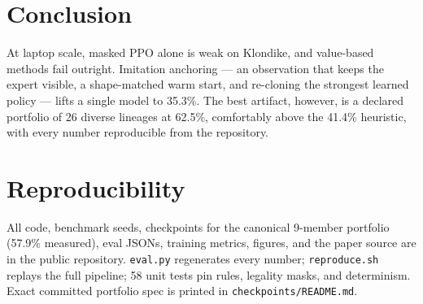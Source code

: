 \documentclass[11pt]{article}
\begin{document}
\section{Conclusion}
At laptop scale, masked PPO alone is weak on Klondike, and value-based
methods fail outright. Imitation anchoring — an observation that keeps
the expert visible, a shape-matched warm start, and re-cloning the
strongest learned policy — lifts a single model to 35.3\%. The best
artifact, however, is a declared portfolio of 26 diverse lineages at
62.5\%, comfortably above the 41.4\% heuristic, with every number
reproducible from the repository.

\section*{Reproducibility}
All code, benchmark seeds, checkpoints for the canonical 9-member
portfolio (57.9\% measured), eval JSONs, training metrics, figures, and
the paper source are in the public repository. \texttt{eval.py} regenerates
every number; \texttt{reproduce.sh} replays the full pipeline; 58 unit
tests pin rules, legality masks, and determinism. Exact committed
portfolio spec is printed in \texttt{checkpoints/README.md}.
\end{document}

